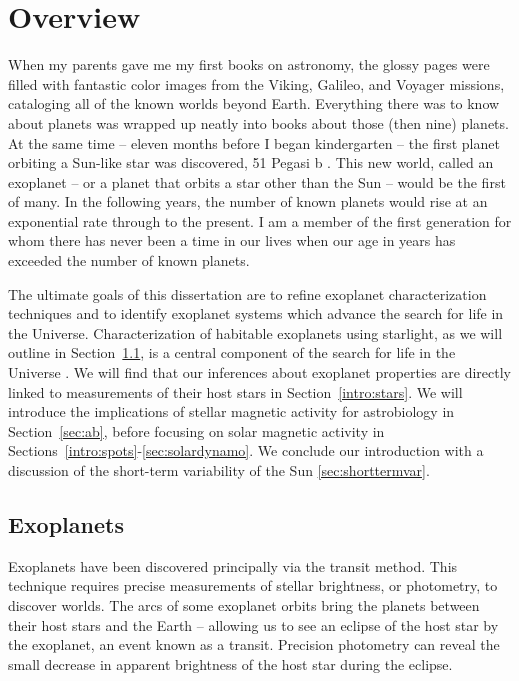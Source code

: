 
\section{Overview}

When my parents gave me my first books on astronomy, the glossy pages were filled with fantastic color images from the Viking, Galileo, and Voyager missions, cataloging all of the known worlds beyond Earth. Everything there was to know about planets was wrapped up neatly into books about those (then nine) planets. At the same time -- eleven months before I began kindergarten -- the first planet orbiting a Sun-like star was discovered, 51 Pegasi b \citep{Mayor1995}. This new world, called an exoplanet -- or a planet that orbits a star other than the Sun -- would be the first of many. In the following years, the number of known planets would rise at an exponential rate through to the present. I am a member of the first generation for whom there has never been a time in our lives when our age in years has exceeded the number of known planets.

The ultimate goals of this dissertation are to refine exoplanet characterization techniques and to identify exoplanet systems which advance the search for life in the Universe. Characterization of habitable exoplanets using starlight, as we will outline in Section~\ref{intro:exoplanets}, is a central component of the search for life in the Universe \citep{DesMarais2008}. We will find that our inferences about exoplanet properties are directly linked to measurements of their host stars in Section~\ref{intro:stars}. We will introduce the implications of stellar magnetic activity for astrobiology in Section~\ref{sec:ab}, before focusing on solar magnetic activity in Sections~\ref{intro:spots}-\ref{sec:solardynamo}. We conclude our introduction with a discussion of the short-term variability of the Sun \ref{sec:shorttermvar}.

\subsection{Exoplanets} \label{intro:exoplanets}

Exoplanets have been discovered principally via the transit method. This technique requires precise measurements of stellar brightness, or photometry, to discover worlds. The arcs of some exoplanet orbits bring the planets between their host stars and the Earth -- allowing us to see an eclipse of the host star by the exoplanet, an event known as a transit. Precision photometry can reveal the small decrease in apparent brightness of the host star during the eclipse. 

